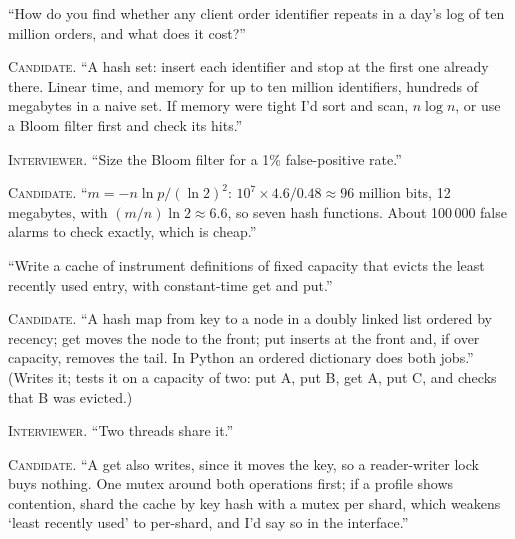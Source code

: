 \begin{interviewq}\label{iq:iv:mock-interviews:7}
``How do you find whether any client order identifier repeats in a day's log of ten million orders, and what does it cost?''
\end{interviewq}

\noindent\textsc{Candidate.} ``A hash set: insert each identifier and stop at the first one already there. Linear time, and memory
for up to ten million identifiers, hundreds of megabytes in a naive set. If memory were tight I'd sort and scan, $n \log n$,
or use a Bloom filter first and check its hits.''


\noindent\textsc{Interviewer.} ``Size the Bloom filter for a 1\% false-positive rate.''

\noindent\textsc{Candidate.} ``$m = -n\ln p/(\ln 2)^2$: $10^7 \times 4.6/0.48 \approx 96$ million bits, 12 megabytes, with $(m/n)\ln 2
\approx 6.6$, so seven hash functions. About 100\,000 false alarms to check exactly, which is cheap.''


\begin{interviewq}\label{iq:iv:mock-interviews:8}
``Write a cache of instrument definitions of fixed capacity that evicts the least recently used entry, with constant-time get and
put.''
\end{interviewq}

\noindent\textsc{Candidate.} ``A hash map from key to a node in a doubly linked list ordered by recency; get moves the node to the
front; put inserts at the front and, if over capacity, removes the tail. In Python an ordered dictionary does both jobs.'' (Writes
it; tests it on a capacity of two: put A, put B, get A, put C, and checks that B was evicted.)


\noindent\textsc{Interviewer.} ``Two threads share it.''

\noindent\textsc{Candidate.} ``A get also writes, since it moves the key, so a reader-writer lock buys nothing. One mutex around both
operations first; if a profile shows contention, shard the cache by key hash with a mutex per shard, which weakens `least recently
used' to per-shard, and I'd say so in the interface.''

